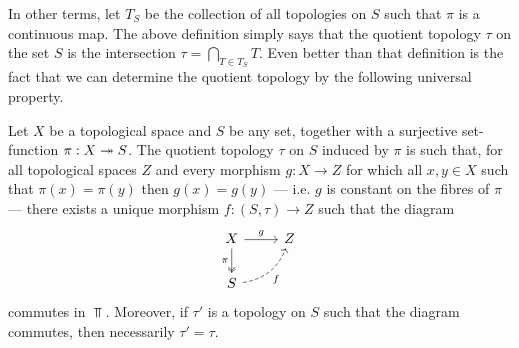 In other terms, let \(T_S\) be the collection of all topologies on \(S\) such
that \(\pi\) is a continuous map. The above definition simply says that the
quotient topology \(\tau\) on the set \(S\) is the intersection
\(\tau = \bigcap_{T \in T_S}T\). Even better than that definition is the
fact that we can determine the quotient topology by the following universal
property.

\begin{theorem}
\label{thm:universal-property-quotient-topology}
Let \(X\) be a topological space and \(S\) be any set, together with a
surjective set-function \(\pi: X \twoheadrightarrow S\). The quotient topology \(\tau\)
on \(S\) induced by \(\pi\) is such that, for all topological spaces \(Z\) and
every morphism \(g: X \to Z\) for which all \(x, y \in X\) such that
\(\pi(x) = \pi(y)\) then \(g(x) = g(y)\) --- i.e. \(g\) is constant on the
fibres of \(\pi\) --- there exists a unique morphism
\(f: (S, \tau) \to Z\) such that the diagram
\[
  \begin{tikzcd}
    X \ar[r, "g"] \ar[d, two heads, swap, "\pi"] &Z\\
    S \ar[ur, swap, bend right, dashed, "f"]
  \end{tikzcd}
\]
commutes in \(\Top\). Moreover, if \(\tau'\) is a topology on \(S\) such
that the diagram commutes, then necessarily \(\tau' = \tau\).
\end{theorem}

